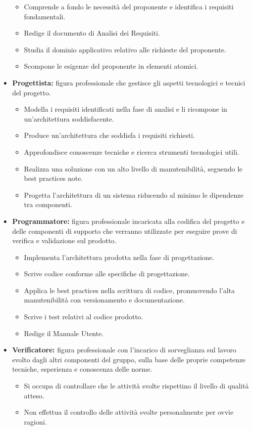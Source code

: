 \documentclass{article}
\begin{document}
\begin{itemize}
\begin{itemize}
            \item Comprende a fondo le necessità del proponente e identifica i requisiti fondamentali.
            \item Redige il documento di Analisi dei Requisiti.
            \item Studia il dominio applicativo relativo alle richieste del proponente.
            \item Scompone le esigenze del proponente in elementi atomici.
        \end{itemize}
    \item \textbf{Progettista:} figura professionale che gestisce gli aspetti tecnologici e tecnici del progetto.
        \begin{itemize}
            \item Modella i requisiti identificati nella fase di analisi e li ricompone in un'architettura soddisfacente.
            \item Produce un'architettura che soddisfa i requisiti richiesti.
            \item Approfondisce conoscenze tecniche e ricerca strumenti tecnologici utili.
            \item Realizza una soluzione con un alto livello di manutenibilità, seguendo le best practices note.
            \item Progetta l'architettura di un sistema riducendo al minimo le dipendenze tra componenti.
        \end{itemize}
    \item \textbf{Programmatore:} figura professionale incaricata alla codifica del progetto e delle componenti di supporto che verranno utilizzate per eseguire prove di verifica e validazione sul prodotto.
        \begin{itemize}
            \item Implementa l'architettura prodotta nella fase di progettazione.
            \item Scrive codice conforme alle specifiche di progettazione.
            \item Applica le best practices nella scrittura di codice, promuovendo l'alta manutenibilità con versionamento e documentazione.
            \item Scrive i test relativi al codice prodotto.
            \item Redige il Manuale Utente.
        \end{itemize}
    \item  \textbf{Verificatore:} figura professionale con l’incarico di sorveglianza sul lavoro svolto dagli altri componenti del gruppo, sulla base delle proprie competenze tecniche, esperienza e conoscenza delle norme.
        \begin{itemize}
            \item Si occupa di controllare che le attività svolte rispettino il livello di qualità atteso.
            \item Non effettua il controllo delle attività svolte personalmente per ovvie ragioni.
        \end{itemize}
        
\end{itemize}
\end{document}
